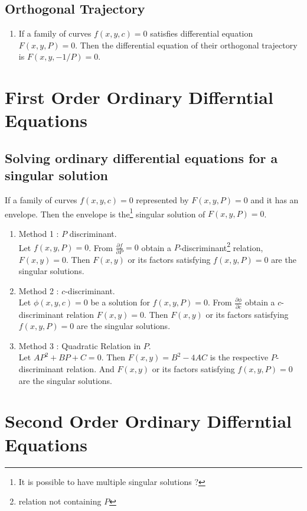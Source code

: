 \subsection{Orthogonal Trajectory}
\begin{enumerate}
	\item If a family of curves $f(x,y,c) = 0$ satisfies differential equation $F(x,y,P) = 0$. Then the differential equation of their orthogonal trajectory is $F(x,y,-1/P) = 0$.
\end{enumerate}

\section{First Order Ordinary Differntial Equations}
\subsection{Solving ordinary differential equations for a singular solution}
\begin{definition}
	If a family of curves $f(x,y,c) = 0$ represented by $F(x,y,P) = 0$ and it has an envelope. Then the envelope is the\footnote{It is possible to have multiple singular solutions ?} singular solution of $F(x,y,P) = 0$.
\end{definition}
\begin{enumerate}
	\item Method 1 : $P$ discriminant.\\
		Let $f(x,y,P) = 0$.
		From $\frac{\partial f}{\partial P} = 0$ obtain a $P$-discriminant\footnote{relation not containing $P$} relation, $F(x,y) = 0$. Then $F(x,y)$ or its factors satisfying $f(x,y,P) = 0$ are the singular solutions.
	\item Method 2 : $c$-discriminant.\\
		Let $\phi(x,y,c) = 0$ be a solution for $f(x,y,P) = 0$.
		From $\frac{\partial \phi}{\partial c}$ obtain a $c$-discriminant relation $F(x,y) = 0$.
		Then $F(x,y)$ or its factors satisfying $f(x,y,P) = 0$ are the singular solutions.
	\item Method 3 : Quadratic Relation in $P$.\\
		Let $AP^2 + BP + C = 0$.
		Then $F(x,y) = B^2-4AC$ is the respective $P$-discriminant relation.
		And $F(x,y)$ or its factors satisfying $f(x,y,P) = 0$ are the singular solutions.
\end{enumerate}

\section{Second Order Ordinary Differntial Equations}
